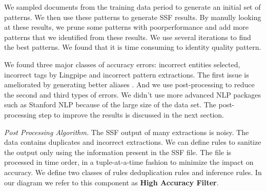 We sampled documents from the training data period to generate an initial set of patterns. We then use these patterns to generate SSF results. By manully looking at these results, we prune some patterns with poor­performance and add more patterns that we identified from these results. We use several iterations to find the best patterns. We found that it is time consuming to identity quality pattern.




We found three major classes of accuracy errors: incorrect entities selected, incorrect tags by Lingpipe and incorrect pattern extractions. The first issue is ameliorated by generating better aliases . And we use post-processing to reduce the second and third types of errors. We didn't use more advanced NLP packages such as Stanford NLP because of the large size of the data set. The post-processing step to improve the results is discussed in the next section.

\textit{Post Processing Algorithm.}
The SSF output of many extractions is noisy. The data contains duplicates and incorrect extractions. We can define rules to sanitize the output only using the information present in the SSF file. The file is processed in time order, in a tuple-at-a-time fashion to minimize the impact on accuracy. We define two classes of rules deduplication rules and inference rules. In our diagram we refer to this component as \textbf{High Accuracy Filter}.
